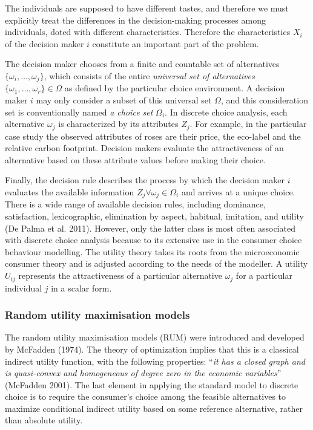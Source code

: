 \documentclass[12pt,]{article}
\begin{document}
The individuals are supposed to have different tastes, and therefore we
must explicitly treat the differences in the decision-making processes
among individuals, doted with different characteristics. Therefore the
characteristics \(X_i\) of the decision maker \(i\) constitute an
important part of the problem.

The decision maker chooses from a finite and countable set of
alternatives \(\{\omega_i, \dots, \omega_j\}\), which consists of the
entire \emph{universal set of alternatives}
\(\{\omega_1, \dots, \omega_r \} \in \Omega\) as defined by the
particular choice environment. A decision maker \(i\) may only consider
a subset of this universal set \(\Omega\), and this consideration set is
conventionally named \emph{a choice set} \(\Omega_i\). In discrete
choice analysis, each alternative \(\omega_j\) is characterized by its
attributes \(Z_j\). For example, in the particular case study the
observed attributes of roses are their price, the eco-label and the
relative carbon footprint. Decision makers evaluate the attractiveness
of an alternative based on these attribute values before making their
choice.

Finally, the decision rule describes the process by which the decision
maker \(i\) evaluates the available information
\(Z_j \forall \omega_j \in \Omega_i\) and arrives at a unique choice.
There is a wide range of available decision rules, including dominance,
satisfaction, lexicographic, elimination by aspect, habitual, imitation,
and utility (De Palma et al. 2011). However, only the latter class is
most often associated with discrete choice analysis because to its
extensive use in the consumer choice behaviour modelling. The utility
theory takes its roots from the microeconomic consumer theory and is
adjusted according to the needs of the modeller. A utility \(U_{ij}\)
represents the attractiveness of a particular alternative \(\omega_j\)
for a particular individual \(j\) in a scalar form.

\hypertarget{random-utility-maximisation-models}{%
\subsubsection{Random utility maximisation
models}\label{random-utility-maximisation-models}}

The random utility maximisation models (RUM) were introduced and
developed by McFadden (1974). The theory of optimization implies that
this is a classical indirect utility function, with the following
properties: ``\emph{it has a closed graph and is quasi-convex and
homogeneous of degree zero in the economic variables}'' (McFadden 2001).
The last element in applying the standard model to discrete choice is to
require the consumer's choice among the feasible alternatives to
maximize conditional indirect utility based on some reference
alternative, rather than absolute utility.
\end{document}
